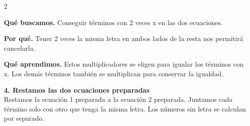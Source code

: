 \documentclass[11pt,a4paper,landscape]{article}
\begin{document}
\begin{multicols*}{2}
\begin{minipage}{\linewidth}
\par\smallskip\textbf{Qué buscamos.} Conseguir términos con 2 veces x en las dos ecuaciones.
\par\smallskip\textbf{Por qué.} Tener 2 veces la misma letra en ambos lados de la resta nos permitirá cancelarla.
\par{}\par\smallskip
\par\smallskip\textbf{Qué aprendimos.} Estos multiplicadores se eligen para igualar los términos con x. Los demás términos también se multiplican para conservar la igualdad.
\end{minipage}\par\medskip
\noindent\begin{minipage}{\linewidth}\textbf{4. Restamos las dos ecuaciones preparadas}\\[2pt]Restamos la ecuación 1 preparada a la ecuación 2 preparada. Juntamos cada término solo con otro que tenga la misma letra. Los números sin letra se calculan por separado.
\par{}\par\smallskip

\end{minipage}
\end{multicols*}
\end{document}
